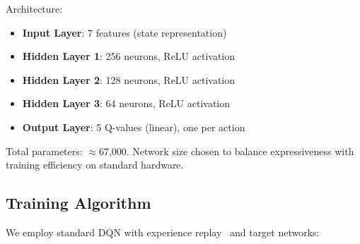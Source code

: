 \documentclass[11pt,a4paper]{article}
\begin{document}
Architecture:
\begin{itemize}
    \item \textbf{Input Layer}: 7 features (state representation)
    \item \textbf{Hidden Layer 1}: 256 neurons, ReLU activation
    \item \textbf{Hidden Layer 2}: 128 neurons, ReLU activation
    \item \textbf{Hidden Layer 3}: 64 neurons, ReLU activation
    \item \textbf{Output Layer}: 5 Q-values (linear), one per action
\end{itemize}

Total parameters: $\approx$67,000. Network size chosen to balance expressiveness with training efficiency on standard hardware.

\subsection{Training Algorithm}

We employ standard DQN with experience replay~\cite{mnih2015} and target networks:
\end{document}
